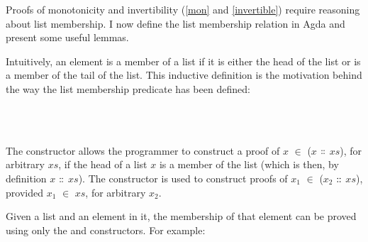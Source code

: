 \documentclass[12pt,a4paper,twoside,openright]{report}
\newcommand{\C}{\AgdaInductiveConstructor}
\begin{document}
Proofs of monotonicity and invertibility (\autoref{mon} and \autoref{invertible}) require reasoning about list membership. I now define the list membership relation in Agda and present some useful lemmas.

Intuitively, an element is a member of a list if it is either the head of the list or is a member of the tail of the list. This inductive definition is the motivation behind the way the list membership predicate has been defined:

\begin{code}
\>  \AgdaSymbol{\{} \AgdaSymbol{:} \AgdaSymbol{\}} \AgdaSymbol{:}       \<%
\\
\>[0]\<[2]%
\>[2] \<[8]%
\>[8]\AgdaSymbol{:} \AgdaSymbol{(} \AgdaSymbol{:} \AgdaSymbol{)}  \AgdaSymbol{(} \AgdaSymbol{:}  \AgdaSymbol{)}    \AgdaSymbol{(}  \AgdaSymbol{)}\<%
\\
\>[0]\<[2]%
\>[2] \AgdaSymbol{:} \AgdaSymbol{(}  \AgdaSymbol{:} \AgdaSymbol{)}  \AgdaSymbol{(} \AgdaSymbol{:}  \AgdaSymbol{)}        \AgdaSymbol{(}  \AgdaSymbol{)}\<%
\end{code}

The constructor \C{here} allows the programmer to construct a proof of $x$ $\in$ ($x$ $\dblcolon$ $xs$), for arbitrary $xs$, if the head of a list $x$ is a member of the list (which is then, by definition $x$ $\dblcolon$ $xs$).  
The \C{there} constructor is used to construct proofs of $x_1$ $\in$ ($x_2$ $\dblcolon$ $xs$), provided $x_1$ $\in$ $xs$, for arbitrary $x_2$.

Given a list and an element in it, the membership of that element can be proved using only the \C{here} and \C{there} constructors.
For example:
\end{document}
